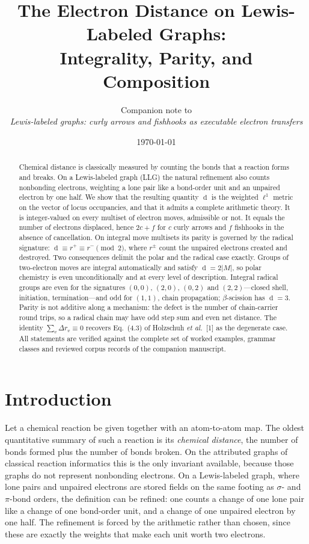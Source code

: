 \documentclass[11pt]{article}
\title{The Electron Distance on Lewis-Labeled Graphs:\\
Integrality, Parity, and Composition}
\author{Companion note to\\
\emph{Lewis-labeled graphs: curly arrows and fishhooks
as executable electron transfers}}
\date{\today}
\numberwithin{equation}{section}
\newcommand{\del}{\operatorname{d}}
\theoremstyle{plain}
\theoremstyle{definition}
\theoremstyle{remark}
\begin{document}
\maketitle

\begin{abstract}
Chemical distance is classically measured by counting the bonds that a
reaction forms and breaks.  On a Lewis-labeled graph (LLG) the natural
refinement also counts nonbonding electrons, weighting a lone pair like a
bond-order unit and an unpaired electron by one half.  We show that the
resulting quantity $\del$ is the weighted $\ell^1$ metric on the vector of
locus occupancies, and that it admits a complete arithmetic theory.  It is
integer-valued on every multiset of electron moves, admissible or not.  It
equals the number of electrons displaced, hence $2c+f$ for $c$ curly arrows
and $f$ fishhooks in the absence of cancellation.  On integral move multisets
its parity is governed by the radical signature: $\del\equiv r^+\equiv
r^-\pmod2$, where $r^\pm$ count the unpaired electrons created and destroyed.
Two consequences delimit the polar and the radical case exactly.  Groups of
two-electron moves are integral automatically and satisfy $\del=2|M|$, so
polar chemistry is even unconditionally and at every level of description.
Integral radical groups are even for the signatures $(0,0)$, $(2,0)$, $(0,2)$
and $(2,2)$---closed shell, initiation, termination---and odd for $(1,1)$,
chain propagation; $\beta$-scission has $\del=3$.  Parity is not additive
along a mechanism: the defect is the number of chain-carrier round trips, so
a radical chain may have odd step sum and even net distance.  The identity
$\sum_v\Delta r_v\equiv0$ recovers Eq.~(4.3) of Holzschuh \emph{et al.}~[1] as
the degenerate case.  All statements are verified against the complete set of
worked examples, grammar classes and reviewed corpus records of the companion
manuscript.
\end{abstract}

\tableofcontents

\section{Introduction}
\label{sec:intro}

Let a chemical reaction be given together with an atom-to-atom map.  The
oldest quantitative summary of such a reaction is its \emph{chemical
distance}, the number of bonds formed plus the number of bonds broken.  On the
attributed graphs of classical reaction informatics this is the only
invariant available, because those graphs do not represent nonbonding
electrons.  On a Lewis-labeled graph, where lone pairs and unpaired electrons
are stored fields on the same footing as $\sigma$- and $\pi$-bond orders, the
definition can be refined: one counts a change of one lone pair like a change
of one bond-order unit, and a change of one unpaired electron by one half.
The refinement is forced by the arithmetic rather than chosen, since these are
exactly the weights that make each unit worth two electrons.
\end{document}
